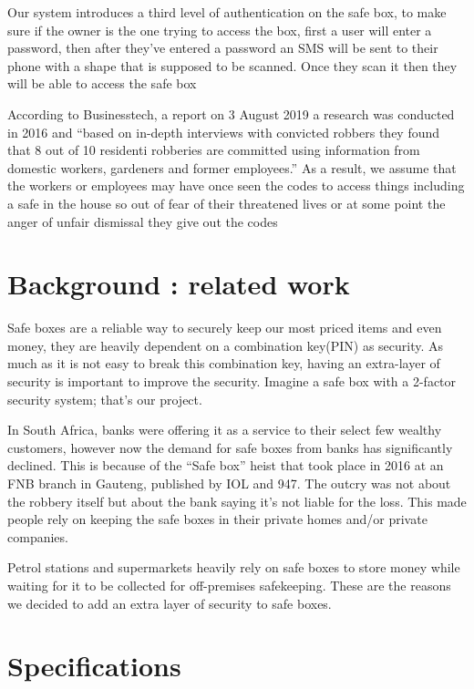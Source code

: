 \documentclass[10pt,sigconf, review]{article}
\begin{document}
Our system introduces a third level of authentication on the safe box, to make
sure if the owner is the one trying to access the box, first a user will enter
a password, then after they’ve entered a password an SMS will be sent to their
phone with a shape that is supposed to be scanned. Once they scan it then they
will be able to access the safe box

According to Businesstech, a report on 3 August 2019 a research was conducted
in 2016 and “based on in-depth interviews with convicted robbers they found
that 8 out of 10 residenti robberies are committed using information from
domestic workers, gardeners and former employees.” As a result, we assume that
the workers or employees may have once seen the codes to access things
including a safe in the house so out of fear of their threatened lives or at
some point the anger of unfair dismissal they give out the codes


\section{Background : related work}

Safe boxes are a reliable way to securely keep our most priced items and even
money, they are heavily dependent on a combination key(PIN) as security. As
much as it is not easy to break this combination key, having an extra-layer of
security is important to improve the security. Imagine a safe box with a
2-factor security system; that’s our project.

In South Africa, banks were offering it as a service to their select few
wealthy customers, however now the demand for safe boxes from banks has
significantly declined. This is because of the ``Safe box” heist that took
place in 2016 at an FNB branch in Gauteng, published by IOL  and 947. The
outcry was not about the robbery itself but about the bank saying it’s not
liable for the loss. This made people rely on keeping the safe boxes in their
private homes and/or private companies.

Petrol stations and supermarkets heavily rely on safe boxes to store money
while waiting for it to be collected for off-premises safekeeping. These are
the reasons we decided to add an extra layer of security to safe boxes.


\section{Specifications}
\end{document}
